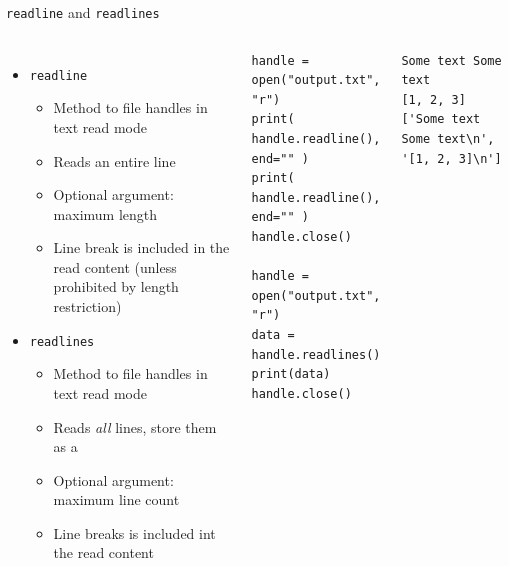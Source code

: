 \begin{frame}[fragile]{\texttt{readline} and \texttt{readlines}}
%
\begin{columns}[T]
\begin{itemize}
\item \texttt{readline}
	\begin{itemize}
	\item Method to file handles in text read mode
	\item Reads an entire line
	\item Optional argument: maximum length
	\item Line break is included in the read content (unless prohibited by length restriction)
	\end{itemize}
\item \texttt{readlines}
	\begin{itemize}
	\item Method to file handles in text read mode
	\item Reads \emph{all} lines, store them as a 
	\item Optional argument: maximum line count
	\item Line breaks is included int the read content
	\end{itemize}
\end{itemize}
%
\vspace{-10pt}
\begin{codebox}
\begin{verbatim}
handle = open("output.txt", "r")
print( handle.readline(), end="" )
print( handle.readline(), end="" )
handle.close()

handle = open("output.txt", "r")
data = handle.readlines()
print(data)
handle.close()
\end{verbatim}
\end{codebox}
%
\begin{cmdbox}
\begin{verbatim}
Some text Some text
[1, 2, 3]
['Some text Some text\n', '[1, 2, 3]\n']
\end{verbatim}
\end{cmdbox}
%
\end{columns}
%
\end{frame}


